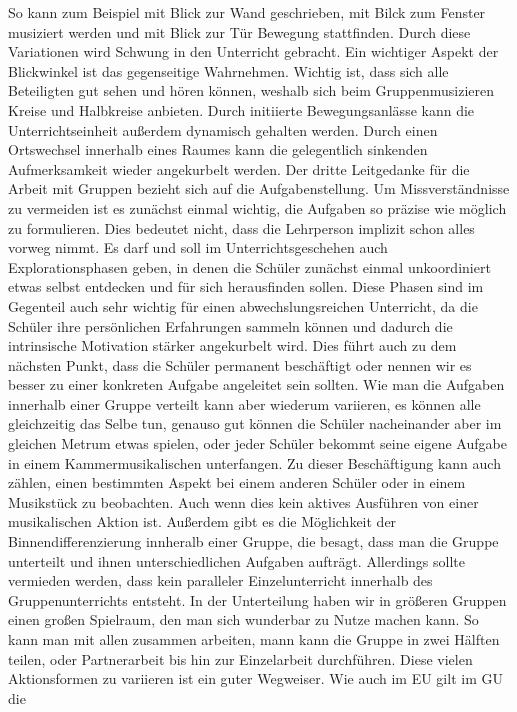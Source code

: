 So kann zum Beispiel mit Blick zur Wand geschrieben, mit Bilck zum Fenster
musiziert werden und mit Blick zur Tür Bewegung stattfinden. Durch diese Variationen
wird Schwung in den Unterricht gebracht. Ein wichtiger Aspekt der
Blickwinkel ist das gegenseitige Wahrnehmen. Wichtig ist, dass sich alle
Beteiligten gut sehen und hören können, weshalb sich beim Gruppenmusizieren
Kreise und Halbkreise anbieten. Durch initiierte Bewegungsanlässe kann die
Unterrichtseinheit außerdem dynamisch gehalten werden. Durch einen Ortswechsel
innerhalb eines Raumes kann die gelegentlich sinkenden Aufmerksamkeit wieder
angekurbelt werden. Der dritte Leitgedanke für die Arbeit mit Gruppen bezieht
sich auf die Aufgabenstellung. Um Missverständnisse zu vermeiden ist es zunächst
einmal wichtig, die Aufgaben so präzise wie möglich zu formulieren. Dies
bedeutet nicht, dass die Lehrperson implizit schon alles vorweg nimmt. Es darf
und soll im Unterrichtsgeschehen auch Explorationsphasen geben, in denen die
Schüler zunächst einmal unkoordiniert etwas selbst entdecken und für sich
herausfinden sollen. Diese Phasen sind im Gegenteil auch sehr wichtig für einen
abwechslungsreichen Unterricht, da die Schüler ihre persönlichen Erfahrungen
sammeln können und dadurch die intrinsische Motivation stärker angekurbelt wird.
Dies führt auch zu dem nächsten Punkt, dass die Schüler permanent beschäftigt
oder nennen wir es besser zu einer konkreten Aufgabe angeleitet sein sollten.
Wie man die Aufgaben innerhalb einer Gruppe verteilt kann aber wiederum
variieren, es können alle gleichzeitig das Selbe tun, genauso gut können die
Schüler nacheinander aber im gleichen Metrum etwas spielen, oder jeder Schüler
bekommt seine eigene Aufgabe in einem Kammermusikalischen unterfangen. Zu dieser
Beschäftigung kann auch zählen, einen bestimmten Aspekt bei einem anderen
Schüler oder in einem Musikstück zu beobachten. Auch wenn dies kein aktives
Ausführen von einer musikalischen Aktion ist. Außerdem gibt es die Möglichkeit
der Binnendifferenzierung innheralb einer Gruppe, die besagt, dass man die
Gruppe unterteilt und ihnen unterschiedlichen Aufgaben aufträgt. Allerdings
sollte vermieden werden, dass kein paralleler Einzelunterricht innerhalb des
Gruppenunterrichts entsteht. In der Unterteilung haben wir in größeren Gruppen
einen großen Spielraum, den man sich wunderbar zu Nutze machen kann. So kann man
mit allen zusammen arbeiten, mann kann die Gruppe in zwei Hälften teilen, oder
Partnerarbeit bis hin zur Einzelarbeit durchführen. Diese vielen Aktionsformen
zu variieren ist ein guter Wegweiser. Wie auch im EU gilt im GU die
